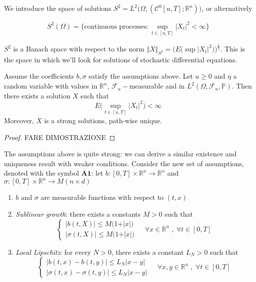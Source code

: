 We introduce the space of solutions $S^2 = L^2\big(\Omega, (\mathcal{C}^0[u,T]; \mathbb{R}^n)\big)$, or alternatively

\begin{equation*}
    S^2(\Omega) = \{ \text{continuous processes} : \sup_{t \in [u,T]} \vert X_t \vert^2 < \infty \}    
\end{equation*}

$S^2$ is a Banach space with respect to the norm $\Vert X \Vert_{S^2} = \Big( E\big( \sup \vert X_t \vert^2 \big) \Big)^{\frac{1}{2}}$. This is the space in which we'll look for solutions of stochastic differential equations. 

\begin{theorem}
    Assume the coefficients $b,\sigma$ satisfy the assumptions above. Let $u \geq 0$ and $\eta$ a random variable with values in $\mathbb{R}^n$, $\mathcal{F}_u-$measurable and in $L^2(\Omega,\mathcal{F}_u,\mathbb{P})$. Then there exists a solution $X$ such that
    \begin{equation*}
        E\Big( \sup_{t \in [u,T]} \vert X_t \vert^2 \Big) < \infty 
    \end{equation*}
    Moreover, $X$ is a strong solutions, path-wise unique.
\end{theorem}
\begin{proof}
    FARE DIMOSTRAZIONE
\end{proof}

    The assumptions above is quite strong: we can derive a similar existence and uniqueness result with weaker conditions. Consider the new set of assumptions, denoted with the symbol $\textbf{A1}$: let $b : [0,T] \times \mathbb{R}^n \to \mathbb{R}^n$ and $\sigma : [0,T] \times \mathbb{R}^n \to M(n \times d)$
\begin{enumerate}
    \item $b$ and $\sigma$ are measurable functions with respect to $(t,x)$
    \item \textit{Sublinear growth}: there exists a constants $M > 0$ such that
    \begin{equation*}
        \begin{cases}
            \vert b(t,X) \vert \leq M\big(1+\vert x \vert\big) \\
            \vert \sigma(t,X) \vert \leq M\big( 1 + \vert x \vert \big)
        \end{cases}
        \;\;\;\;
        \forall x \in \mathbb{R}^n \; , \; \forall t \in [0,T]
    \end{equation*}
    \item \textit{Local Lipschitz}: for every $N>0$, there exists a constant $L_N > 0$ such that
    \begin{equation*}
        \begin{cases}
            \vert b(t,x) - b(t,y) \vert \leq L_N\vert x-y \vert \\
            \vert \sigma(t,x)-\sigma(t,y) \vert \leq L_N\vert x - y \vert
        \end{cases}
        \;\;\;\;
        \forall x,y \in \mathbb{R}^n \; , \; \forall t \in [0,T]
    \end{equation*}
\end{enumerate}

